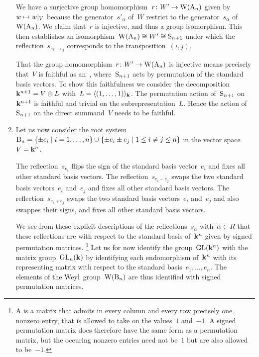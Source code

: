 \begin{examples}
\begin{enumerate}
      We have a surjective group homomorphism~$r \colon W' \to \operatorname{W}(\mathrm{A}_n)$ given by~$w \mapsto \restrict{w}{V}$ because the generator~$s'_\alpha$ of~$W$ restrict to the generator~$s_\alpha$ of~$\operatorname{W}(\mathrm{A}_n)$.
      We claim that~$r$ is injective, and thus a group isomorphism.
      This then establishes an isomorphism~$\operatorname{W}(\mathrm{A}_n) \cong W' \cong \operatorname{S}_{n+1}$ under which the reflection~$s_{e_i - e_j}$ corresponds to the transposition~$(i,j)$.
      
      That the group homomorphism~$r \colon W' \to \operatorname{W}(\mathrm{A}_n)$ is injective means precisely that~$V$ is faithful as an~{}, where~$\operatorname{S}_{n+1}$ acts by permutation of the standard basis vectors.
      To show this faithfulness we consider the decomposition~$\mathbf{k}^{n+1} = V \oplus L$ with~$L = \langle(1, \dotsc, 1)\rangle_{\mathbf{k}}$.
      The permutation action of~$\operatorname{S}_{n+1}$ on~$\mathbf{k}^{n+1}$ is faithful and trivial on the subrepresentation~$L$.
      Hence the action of~$\operatorname{S}_{n+1}$ on the direct summand~$V$ needs to be faithful.
    \item
      Let us now consider the root system~$\rootB_n = \{ \pm e_i \suchthat i = 1, \dotsc, n \} \cup \{ \pm e_i \pm e_j \suchthat 1 \leq i \neq j \leq n \}$ in the vector space~$V = \mathbf{k}^n$.
      
      The reflection~$s_{e_i}$ flips the sign of the standard basis vector~$e_i$ and fixes all other standard basis vectors.
      The reflection~$s_{e_i - e_j}$ swaps the two standard basis vectors~$e_i$ and~$e_j$ and fixes all other standard basis vectors.
      The reflection~$s_{e_i + e_j}$ swaps the two standard basis vectors~$e_i$ and~$e_j$ and also swappes their signs, and fixes all other standard basis vectors.
      
      We see from these explicit descriptions of the reflections~$s_\alpha$ with~$\alpha \in R$ that these reflections are with respect to the standard basis of~$\mathbf{k}^n$ given by signed permutation matrices.%
      \footnote{A  is a matrix that admits in every column and every row precisely one nonzero entry, that is allowed to take on the values~$1$ and~$-1$.
      A signed permutation matrix does therefore have the same form as a permutation matrix, but the occuring nonzero entries need not be~$1$ but are also allowed to be~$-1$.}
      Let us for now identify the group~$\operatorname{GL}(\mathbf{k}^n)$ with the matrix group~$\operatorname{GL}_n(\mathbf{k})$ by identifying each endomorphism of~$\mathbf{k}^n$ with its representing matrix with respect to the standard basis~$e_1, \dotsc, e_n$.
      The elements of the Weyl~group~$\operatorname{W}(\mathrm{B}_n)$ are thus identified with signed permutation matrices.
      

\end{enumerate}
\end{examples}
